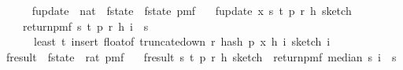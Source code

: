 \begin{isabellebody}
\ \ \ \ {\isacharbraceright}{\kern0pt}{\isachardoublequoteclose}\isanewline
\isanewline
{}\isamarkupfalse%
\ f{}{\isacharunderscore}{\kern0pt}update\ {\isacharcolon}{\kern0pt}{\isacharcolon}{\kern0pt}\ {\isachardoublequoteopen}nat\ {\isasymRightarrow}\ f{}{\isacharunderscore}{\kern0pt}state\ {\isasymRightarrow}\ f{}{\isacharunderscore}{\kern0pt}state\ pmf{\isachardoublequoteclose}\ \isanewline
\ \ {\isachardoublequoteopen}f{}{\isacharunderscore}{\kern0pt}update\ x\ {\isacharparenleft}{\kern0pt}s{\isacharcomma}{\kern0pt}\ t{\isacharcomma}{\kern0pt}\ p{\isacharcomma}{\kern0pt}\ r{\isacharcomma}{\kern0pt}\ h{\isacharcomma}{\kern0pt}\ sketch{\isacharparenright}{\kern0pt}\ {\isacharequal}{\kern0pt}\ \isanewline
\ \ \ \ return{\isacharunderscore}{\kern0pt}pmf\ {\isacharparenleft}{\kern0pt}s{\isacharcomma}{\kern0pt}\ t{\isacharcomma}{\kern0pt}\ p{\isacharcomma}{\kern0pt}\ r{\isacharcomma}{\kern0pt}\ h{\isacharcomma}{\kern0pt}\ {\isasymlambda}i\ {\isasymin}\ {\isacharbraceleft}{\kern0pt}{}{\isachardot}{\kern0pt}{\isachardot}{\kern0pt}{\isacharless}{\kern0pt}s{\isacharbraceright}{\kern0pt}{\isachardot}{\kern0pt}\isanewline
\ \ \ \ \ \ least\ t\ {\isacharparenleft}{\kern0pt}insert\ {\isacharparenleft}{\kern0pt}float{\isacharunderscore}{\kern0pt}of\ {\isacharparenleft}{\kern0pt}truncate{\isacharunderscore}{\kern0pt}down\ r\ {\isacharparenleft}{\kern0pt}hash\ p\ x\ {\isacharparenleft}{\kern0pt}h\ i{\isacharparenright}{\kern0pt}{\isacharparenright}{\kern0pt}{\isacharparenright}{\kern0pt}{\isacharparenright}{\kern0pt}\ {\isacharparenleft}{\kern0pt}sketch\ i{\isacharparenright}{\kern0pt}{\isacharparenright}{\kern0pt}{\isacharparenright}{\kern0pt}{\isachardoublequoteclose}\isanewline
\isanewline
{}\isamarkupfalse%
\ f{}{\isacharunderscore}{\kern0pt}result\ {\isacharcolon}{\kern0pt}{\isacharcolon}{\kern0pt}\ {\isachardoublequoteopen}f{}{\isacharunderscore}{\kern0pt}state\ {\isasymRightarrow}\ rat\ pmf{\isachardoublequoteclose}\ \isanewline
\ \ {\isachardoublequoteopen}f{}{\isacharunderscore}{\kern0pt}result\ {\isacharparenleft}{\kern0pt}s{\isacharcomma}{\kern0pt}\ t{\isacharcomma}{\kern0pt}\ p{\isacharcomma}{\kern0pt}\ r{\isacharcomma}{\kern0pt}\ h{\isacharcomma}{\kern0pt}\ sketch{\isacharparenright}{\kern0pt}\ {\isacharequal}{\kern0pt}\ return{\isacharunderscore}{\kern0pt}pmf\ {\isacharparenleft}{\kern0pt}median\ s\ {\isacharparenleft}{\kern0pt}{\isasymlambda}i\ {\isasymin}\ {\isacharbraceleft}{\kern0pt}{}{\isachardot}{\kern0pt}{\isachardot}{\kern0pt}{\isacharless}{\kern0pt}s{\isacharbraceright}{\kern0pt}{\isachardot}{\kern0pt}\isanewline

\end{isabellebody}
